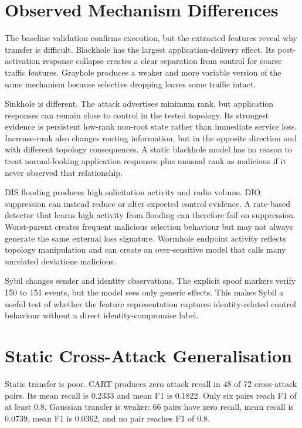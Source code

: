 \section{Observed Mechanism Differences}

The baseline validation confirms execution, but the extracted features reveal why transfer is difficult. Blackhole has the largest application-delivery effect. Its post-activation response collapse creates a clear separation from control for coarse traffic features. Grayhole produces a weaker and more variable version of the same mechanism because selective dropping leaves some traffic intact.

Sinkhole is different. The attack advertises minimum rank, but application responses can remain close to control in the tested topology. Its strongest evidence is persistent low-rank non-root state rather than immediate service loss. Increase-rank also changes routing information, but in the opposite direction and with different topology consequences. A static blackhole model has no reason to treat normal-looking application responses plus unusual rank as malicious if it never observed that relationship.

DIS flooding produces high solicitation activity and radio volume. DIO suppression can instead reduce or alter expected control evidence. A rate-based detector that learns high activity from flooding can therefore fail on suppression. Worst-parent creates frequent malicious selection behaviour but may not always generate the same external loss signature. Wormhole endpoint activity reflects topology manipulation and can create an over-sensitive model that calls many unrelated deviations malicious.

Sybil changes sender and identity observations. The explicit spoof markers verify 150 to 151 events, but the model sees only generic effects. This makes Sybil a useful test of whether the feature representation captures identity-related control behaviour without a direct identity-compromise label.

\section{Static Cross-Attack Generalisation}

Static transfer is poor. CART produces zero attack recall in 48 of 72 cross-attack pairs. Its mean recall is 0.2333 and mean F1 is 0.1822. Only six pairs reach F1 of at least 0.8. Gaussian transfer is weaker: 66 pairs have zero recall, mean recall is 0.0739, mean F1 is 0.0362, and no pair reaches F1 of 0.8.

